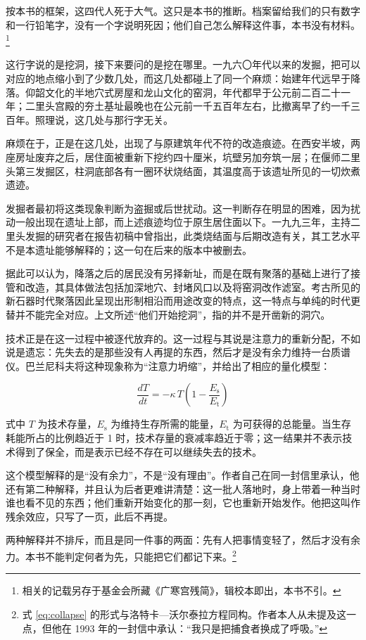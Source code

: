 按本书的框架，这四代人死于大气。这只是本书的推断。档案留给我们的只有数字和一行铅笔字，没有一个字说明死因；他们自己怎么解释这件事，本书没有材料。\footnote{相关的记载另存于基金会所藏《广寒宫残简》，辑校本即出，本书不引。}

这行字说的是挖洞，接下来要问的是挖在哪里。一九六〇年代以来的发掘，把可以对应的地点缩小到了少数几处，而这几处都碰上了同一个麻烦：始建年代远早于降落。仰韶文化的半地穴式房屋和龙山文化的窑洞，年代都早于公元前二百二十一年；二里头宫殿的夯土基址最晚也在公元前一千五百年左右，比撤离早了约一千三百年。照理说，这几处与那行字无关。

麻烦在于，正是在这几处，出现了与原建筑年代不符的改造痕迹。在西安半坡，两座房址废弃之后，居住面被重新下挖约四十厘米，坑壁另加夯筑一层；在偃师二里头第三发掘区，柱洞底部各有一圈环状烧结面，其温度高于该遗址所见的一切炊煮遗迹。

发掘者最初将这类现象判断为盗掘或后世扰动。这一判断存在明显的困难，因为扰动一般出现在遗址上部，而上述痕迹均位于原生居住面以下。一九九三年，主持二里头发掘的研究者在报告初稿中曾指出，此类烧结面与后期改造有关，其工艺水平不是本遗址能够解释的；这一句在后来的版本中被删去。

据此可以认为，降落之后的居民没有另择新址，而是在既有聚落的基础上进行了接管和改造，其具体做法包括加深地穴、封堵风口以及将窑洞改作滤室。考古所见的新石器时代聚落因此呈现出形制相沿而用途改变的特点，这一特点与单纯的时代更替并不能完全对应。上文所述“他们开始挖洞”，指的并不是开凿新的洞穴。

技术正是在这一过程中被逐代放弃的。这一过程与其说是注意力的重新分配，不如说是遗忘：先失去的是那些没有人再提的东西，然后才是没有余力维持一台质谱仪。巴兰尼科夫将这种现象称为“注意力坍缩”，并给出了相应的量化模型：

\begin{equation}
\frac{dT}{dt} = -\kappa \, T \left(1 - \frac{E_{\mathrm{s}}}{E_{\mathrm{t}}}\right)
\label{eq:collapse}
\end{equation}

式中 $T$ 为技术存量，$E_{\mathrm{s}}$ 为维持生存所需的能量，$E_{\mathrm{t}}$ 为可获得的总能量。当生存耗能所占的比例趋近于 1 时，技术存量的衰减率趋近于零；这一结果并不表示技术得到了保全，而是表示已经不存在可以继续失去的技术。

这个模型解释的是“没有余力”，不是“没有理由”。作者自己在同一封信里承认，他还有第二种解释，并且认为后者更难讲清楚：这一批人落地时，身上带着一种当时谁也看不见的东西；他们重新开始变化的那一刻，它也重新开始发作。他把这叫作残余效应，只写了一页，此后不再提。

两种解释并不排斥，而且是同一件事的两面：先有人把事情变轻了，然后才没有余力。本书不能判定何者为先，只能把它们都记下来。\footnote{式 \eqref{eq:collapse} 的形式与洛特卡—沃尔泰拉方程同构。作者本人从未提及这一点，但他在 1993 年的一封信中承认：“我只是把捕食者换成了呼吸。”}

